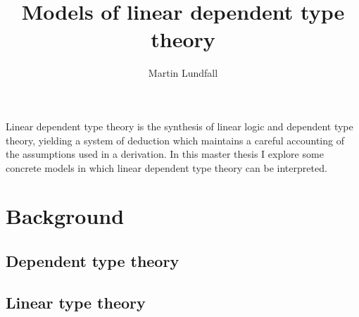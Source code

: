 
\usepackage[margin=0.5in]{geometry}

\title{Models of linear dependent type theory}
\author{Martin Lundfall}
\maketitle
\abstract
Linear dependent type theory is the synthesis of linear logic and dependent type theory, yielding a system of deduction which maintains a careful accounting of the assumptions used in a derivation. In this master thesis I explore some concrete models in which linear dependent type theory can be interpreted.
\newpage
\tableofcontents
\newpage
\section{Background}
\subsection{Dependent type theory}
\subsection{Linear type theory}
